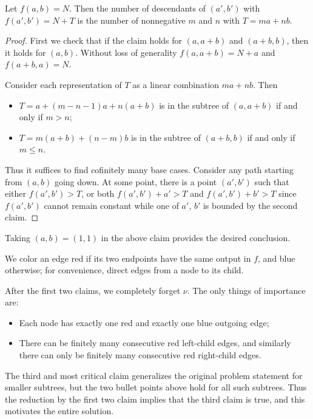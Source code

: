 \begin{iclaim}
     Let $f(a,b)=N$. Then the number of descendants of $(a',b')$ with $f(a',b')=N+T$ is the number of nonnegative $m$ and $n$ with $T=ma+nb$.
\end{iclaim}
\begin{proof}
    First we check that if the claim holds for $(a,a+b)$ and $(a+b,b)$, then it holds for $(a,b)$. Without loss of generality $f(a,a+b)=N+a$ and  $f(a+b,a)=N$.

    Consider each representation of $T$ as a linear combination $ma+nb$. Then
    \begin{itemize}[itemsep=0em]
        \item $T=a+(m-n-1)a+n(a+b)$ is in the subtree of $(a,a+b)$ if and only if $m>n$;
        \item $T=m(a+b)+(n-m)b$ is in the subtree of $(a+b,b)$ if and only if $m\le n$.
    \end{itemize}
    Thus it suffices to find cofinitely many base cases. Consider any path starting from $(a,b)$ going down. At some point, there is a point $(a',b')$ such that either $f(a',b')>T$, or both $f(a',b')+a'>T$ and $f(a',b')+b'>T$ since $f(a',b')$ cannot remain constant while one of $a'$, $b'$ is bounded by the second claim.
\end{proof}

Taking $(a,b)=(1,1)$ in the above claim provides the desired conclusion.
\begin{boxremark}
    We color an edge red if its two endpoints have the same output in $f$, and blue otherwise; for convenience, direct edges from a node to its child.

    After the first two claims, we completely forget $\nu$. The only things of importance are:
    \begin{itemize}
        \item Each node has exactly one red and exactly one blue outgoing edge;
        \item There can be finitely many consecutive red left-child edges, and similarly there can only be finitely many consecutive red right-child edges.
    \end{itemize}
    The third and most critical claim generalizes the original problem statement for smaller subtrees, but the two bullet points above hold for all such subtrees. Thus the reduction by the first two claim implies that the third claim is true, and this motivates the entire solution.
\end{boxremark}

